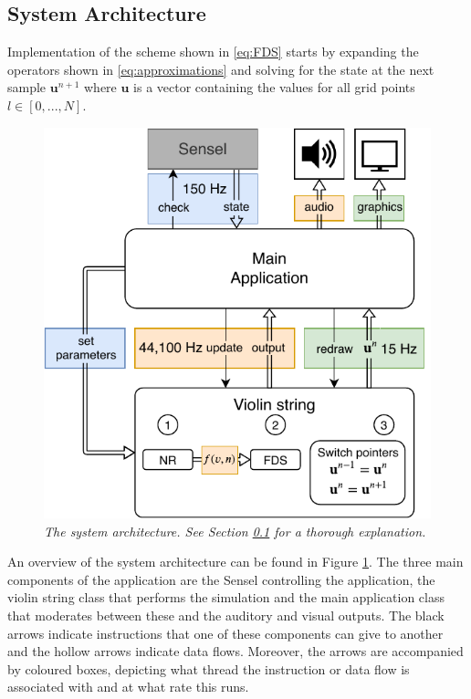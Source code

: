     \subsection{System Architecture}\label{sec:systemArch}
    Implementation of the scheme shown in \eqref{eq:FDS} starts by expanding the operators shown in \eqref{eq:approximations} and solving for the state at the next sample $\mathbf{u}^{n+1}$ where $\mathbf{u}$ is a vector containing the values for all grid points $l\in[0,...,N]$.
    
    \begin{figure}[ht]
    \centerline{\includegraphics[width=\paperFigWidth\textwidth]{figures/systemArchitecture.pdf}}
    \caption{\label{fig:systemArch}{\it The system architecture. See Section \ref{sec:systemArch} for a thorough explanation.}}
    \end{figure}
    
    An overview of the system architecture can be found in Figure \ref{fig:systemArch}. The three main components of the application are the Sensel controlling the application, the violin string class that performs the simulation and the main application class that moderates between these and the auditory and visual outputs. The black arrows indicate instructions that one of these components can give to another and the hollow arrows indicate data flows. Moreover, the arrows are accompanied by coloured boxes, depicting what thread the instruction or data flow is associated with and at what rate this runs. 
    
